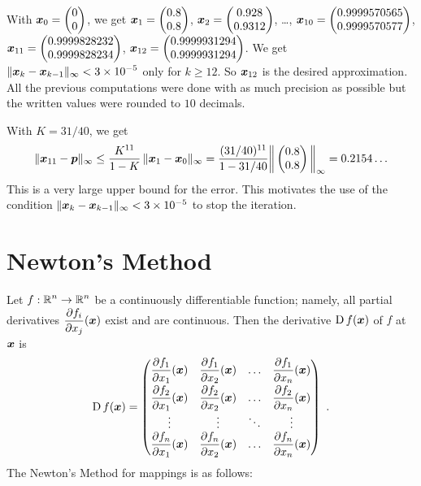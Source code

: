 \begin{egg}
With $\displaystyle \bm{x}_0 = \begin{pmatrix} 0 \\ 0 \end{pmatrix}$, we get
$\displaystyle \bm{x}_1 = \begin{pmatrix} 0.8 \\ 0.8 \end{pmatrix}$,
$\displaystyle \bm{x}_2 = \begin{pmatrix} 0.928 \\ 0.9312 \end{pmatrix}$,
\ldots ,
$\displaystyle \bm{x}_{10} = \begin{pmatrix} 0.9999570565 \\
0.9999570577 \end{pmatrix}$,
$\displaystyle \bm{x}_{11} = \begin{pmatrix} 0.9999828232 \\
0.9999828234 \end{pmatrix}$,
$\displaystyle \bm{x}_{12} = \begin{pmatrix} 0.9999931294 \\
0.9999931294 \end{pmatrix}$.
We get $\displaystyle \|\bm{x}_k - \bm{x}_{k-1}\|_\infty < 3\times 10^{-5}$
only for $k\geq 12$.  So $\bm{x}_{12}$ is the desired approximation.
All the previous computations were done with as much precision as
possible but the written values were rounded to $10$ decimals.

With $K= 31/40$, we get
\[
\| \bm{x}_{11} - \bm{p} \|_\infty \leq \frac{K^{11}}{1-K}\,
\| \bm{x}_1 - \bm{x}_0 \|_\infty
= \frac{(31/40)^{11}}{1- 31/40} 
\bigg\|\begin{pmatrix}
0.8 \\ 0.8
\end{pmatrix}\bigg\|_{\infty}
= 0.2154\ldots
\]
This is a very large upper bound for the error.  This motivates the use
of the condition
\mbox{$\|\bm{x}_k - \bm{x}_{k-1}\|_\infty < 3\times 10^{-5}$}
to stop the iteration.
\end{egg}

\section{Newton's Method}

Let $\displaystyle f:\mathbb{R}^n \rightarrow \mathbb{R}^n$ be a continuously differentiable
function; namely, all partial derivatives
$\displaystyle \frac{\partial{f_i}}{\partial{x_j}}(\bm{x})$ exist and are continuous.
Then the derivative $\operatorname{D} f(\bm{x})$ of $f$ at $\bm{x}$ is
\[
\operatorname{D} f(\bm{x}) = \begin{pmatrix}
\displaystyle \frac{\partial{f_1}}{\partial{x_1}}(\bm{x}) &
\displaystyle \frac{\partial{f_1}}{\partial{x_2}}(\bm{x}) & \ldots &
\displaystyle \frac{\partial{f_1}}{\partial{x_n}}(\bm{x}) \\[0.7em]
\displaystyle \frac{\partial{f_2}}{\partial{x_1}}(\bm{x}) &
\displaystyle \frac{\partial{f_2}}{\partial{x_2}}(\bm{x}) & \ldots &
\displaystyle \frac{\partial{f_2}}{\partial{x_n}}(\bm{x}) \\
\vdots & \vdots & \ddots & \vdots \\
\displaystyle \frac{\partial{f_n}}{\partial{x_1}}(\bm{x}) &
\displaystyle \frac{\partial{f_n}}{\partial{x_2}}(\bm{x}) & \ldots &
\displaystyle \frac{\partial{f_n}}{\partial{x_n}}(\bm{x})
\end{pmatrix} \ .
\]
The Newton's Method for mappings is as follows:


